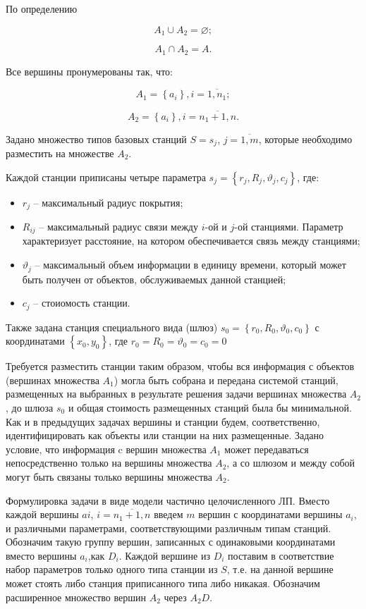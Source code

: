 По определению

$$
A_1 \cup A_2 = \varnothing;
$$

$$
A_1 \cap A_2 = A.
$$

Все вершины пронумерованы так, что:

$$
A_1 = \left\{a_i \right\}, i= \overline{1,n_1};
$$

$$
A_2 = \left\{ a_i  \right\}, i= \overline{n_1+1,n}.
$$


Задано множество типов базовых станций $S = s_j$, $j=\overline{1,m}$, которые необходимо разместить на множестве $A_2$.

Каждой станции приписаны четыре параметра $s_j = \left\{r_j, R_j, \vartheta_j, c_j \right\}$, где: 
\begin{itemize}
    \item $r_j$ -- максимальный радиус покрытия;
    \item $R_{ij}$ -- максимальный радиус связи между $i$-ой и $j$-ой станциями. Параметр характеризует расстояние, на котором обеспечивается связь между станциями;
    \item $\vartheta_j$ -- максимальный объем информации в единицу времени, который может быть получен от объектов, обслуживаемых данной станцией;
    \item $c_j$ -- стоиомость станции.
\end{itemize}

Также задана станция специального вида (шлюз) $s_0 = \left\{ r_0, R_0, \vartheta_0, c_0 \right\}$ с координатами $\left\{x_0, y_0 \right\}$, где $r_0 = R_0 = \vartheta_0 = c_0 = 0$


Требуется разместить станции таким образом, чтобы вся информация с объектов (вершинах множества $A_1$) могла быть собрана и передана системой станций, размещенных на выбранных в результате решения задачи вершинах множества  $A_2$, до шлюза $s_0$ и общая стоимость размещенных станций была бы минимальной.
Как и в предыдущих задачах вершины и станции будем, соответственно, идентифицировать как объекты или станции на них размещенные.
Задано условие, что информация c вершин множества $A_1$ может передаваться непосредственно только на вершины множества $A_2$, а со шлюзом и между собой могут быть связаны только вершины множества $A_2$.

Формулировка задачи в виде модели частично целочисленного ЛП.
Вместо каждой вершины $ai$, $i= \overline{n_1+1,n}$ введем $m$ вершин с координатами вершины $a_i$, и различными параметрами, соответствующими различным типам станций. Обозначим такую группу вершин, записанных с одинаковыми координатами вместо вершины $a_i$,как $D_i$. Каждой вершине из $D_i$ поставим в соответствие набор параметров только одного типа станции из $S$, т.е. на данной вершине может стоять либо станция приписанного типа либо никакая. Обозначим расширенное множество вершин $A_2$ через $A_2D$.

